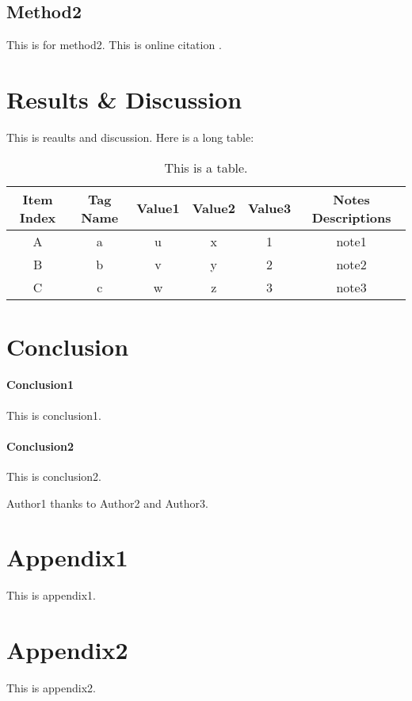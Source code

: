 \documentclass[
aps, %
prb, 
twocolumn, %
10pt, %
superscriptaddress, %
amsfont, %
amssymb, %
amsmath, %
showkeys, %
floats, %
final, 
letterpaper, %
balancelastpage, %
flushbottom, %
citeautoscript,
]{revtex4-2}
\begin{document}
\subsection{Method2}
This is for method2. This is online citation . 

\section{Results \& Discussion}
This is reaults and discussion. 
Here is a long table:
\onecolumngrid
\begin{longtable}{c | c | c | c | c | c}
\caption{This is a table.}
\label{tab:table1}\\
\hline
\textbf{Item Index} & \textbf{Tag Name} & \textbf{Value1} & \textbf{Value2} & \textbf{Value3} & \textbf{Notes Descriptions} \\
\hline
A & a & u & x & 1 & note1 \\
\hline
B & b & v & y & 2 & note2 \\
\hline
C & c & w & z & 3 & note3 \\
\hline
\end{longtable}

\twocolumngrid
\section{Conclusion}
\paragraph{Conclusion1}
This is conclusion1.

\paragraph{Conclusion2}
This is conclusion2.

\begin{acknowledgments}
Author1 thanks to Author2 and Author3.
\end{acknowledgments}



\onecolumngrid
\newpage

\appendix
\section*{Appendix1}
This is appendix1.

\section*{Appendix2}
This is appendix2.
\end{document}

